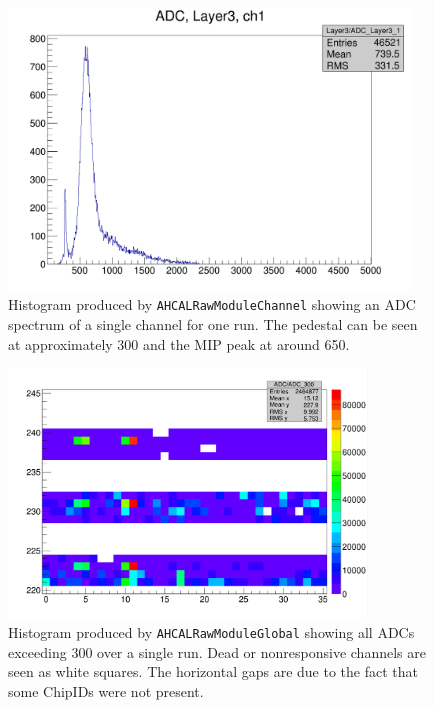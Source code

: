 \begin{figure}[p]
	\centering
	\includegraphics[width=0.95\textwidth]{../Pictures/ChannelModule-May2016.png} %
	\caption{Histogram produced by \texttt{AHCALRawModuleChannel} showing an \acrshort{ADC} spectrum of a single channel for one run. The pedestal can be seen at approximately 300 and the \acrshort{MIP} peak at around 650.}
	\label{figure:aida/may2016/channelmodule}
\end{figure}

\begin{figure}[p]
	\centering
	\includegraphics[width=0.85\textwidth]{../Pictures/GlobalModule-May2016.png} %
	\caption{Histogram produced by \texttt{AHCALRawModuleGlobal} showing all \acrshort{ADC}s exceeding 300 over a single run. Dead or nonresponsive channels are seen as white squares. The horizontal gaps are due to the fact that some ChipIDs were not present.}
	\label{figure:aida/may2016/globalmodule}
\end{figure}

